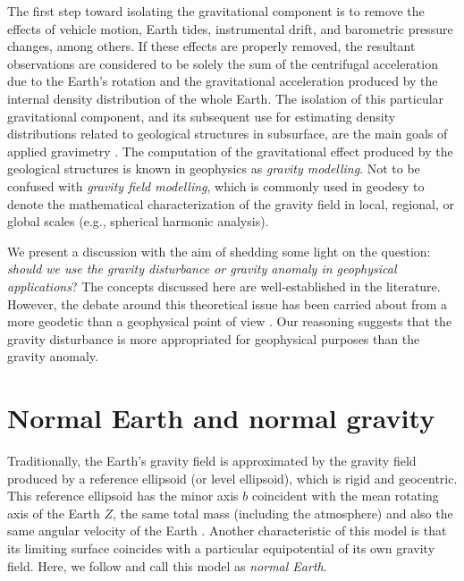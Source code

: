 \documentclass[extra]{gji}
\begin{document}
The first step toward isolating the gravitational component
is to remove the effects of vehicle motion, Earth tides, instrumental drift,
and barometric pressure changes, among others.
If these effects are properly removed,
the resultant observations are considered to be solely
the sum of the centrifugal acceleration due to the Earth's rotation and
the gravitational acceleration produced by
the internal density distribution of the whole Earth.
The isolation of this particular gravitational component,
and its subsequent use for estimating density
distributions related to geological structures in subsurface,
are the main goals of applied gravimetry \citep{blakely1996}.
The computation of the gravitational effect produced by
the geological structures is known in geophysics as
\textit{gravity modelling}.
Not to be confused with \textit{gravity field modelling}, which
is commonly used in geodesy to denote the mathematical characterization of the
gravity field in local, regional, or global scales (e.g., spherical harmonic
analysis).

We present a discussion with the aim of shedding some light on the question:
\textit{should we use the gravity disturbance or gravity anomaly in geophysical
applications}?
The concepts discussed here are well-established in the literature.
However, the debate around this theoretical issue has been
carried about from a more geodetic than a geophysical point of view
\citep{lafehr1991,chapin1996,li2001,fairhead2003,
hackney-featherstone2003,hinze2005}.
Our reasoning suggests that the gravity disturbance is more appropriated for
geophysical purposes than the gravity anomaly.


\section{Normal Earth and normal gravity}

Traditionally, the Earth's gravity field is approximated
by the gravity field produced by a reference ellipsoid
(or level ellipsoid), which is rigid and geocentric.
This reference ellipsoid has the minor axis $b$
coincident with the mean rotating axis of the Earth $Z$, the
same total mass (including the atmosphere) and also the
same angular velocity of the Earth \citep{heiskanen-moritz1967,
vanicek1987,hofmann-wellenhof-moritz2005,torge2012}.
Another characteristic of this model is that its
limiting surface coincides with a particular equipotential
of its own gravity field.
Here, we follow \citep{torge2012} and call this model as
\textit{normal Earth}.
\end{document}
